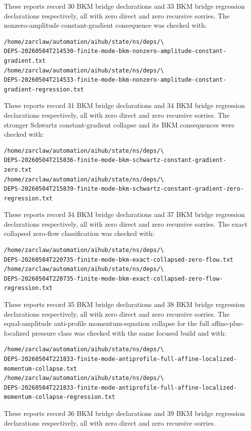 \documentclass[11pt]{article}
\begin{document}
These reports record 30 BKM bridge declarations and 33 BKM bridge regression
declarations respectively, all with zero direct and zero recursive sorries.
The nonzero-amplitude constant-gradient consequence was checked with:
\begin{verbatim}
/home/zarclaw/automation/aihub/state/ns/deps/\
DEPS-20260504T214530-finite-mode-bkm-nonzero-amplitude-constant-gradient.txt
/home/zarclaw/automation/aihub/state/ns/deps/\
DEPS-20260504T214533-finite-mode-bkm-nonzero-amplitude-constant-gradient-regression.txt
\end{verbatim}
These reports record 31 BKM bridge declarations and 34 BKM bridge regression
declarations respectively, all with zero direct and zero recursive sorries.
The stronger Schwartz constant-gradient collapse and its BKM consequences were
checked with:
\begin{verbatim}
/home/zarclaw/automation/aihub/state/ns/deps/\
DEPS-20260504T215836-finite-mode-bkm-schwartz-constant-gradient-zero.txt
/home/zarclaw/automation/aihub/state/ns/deps/\
DEPS-20260504T215839-finite-mode-bkm-schwartz-constant-gradient-zero-regression.txt
\end{verbatim}
These reports record 34 BKM bridge declarations and 37 BKM bridge regression
declarations respectively, all with zero direct and zero recursive sorries.
The exact collapsed zero-flow classification was checked with:
\begin{verbatim}
/home/zarclaw/automation/aihub/state/ns/deps/\
DEPS-20260504T220735-finite-mode-bkm-exact-collapsed-zero-flow.txt
/home/zarclaw/automation/aihub/state/ns/deps/\
DEPS-20260504T220735-finite-mode-bkm-exact-collapsed-zero-flow-regression.txt
\end{verbatim}
These reports record 35 BKM bridge declarations and 38 BKM bridge regression
declarations respectively, all with zero direct and zero recursive sorries.
The equal-amplitude anti-profile momentum-equation collapse for the full
affine-plus-localized pressure class was checked with the same focused build
and with:
\begin{verbatim}
/home/zarclaw/automation/aihub/state/ns/deps/\
DEPS-20260504T221833-finite-mode-antiprofile-full-affine-localized-momentum-collapse.txt
/home/zarclaw/automation/aihub/state/ns/deps/\
DEPS-20260504T221833-finite-mode-antiprofile-full-affine-localized-momentum-collapse-regression.txt
\end{verbatim}
These reports record 36 BKM bridge declarations and 39 BKM bridge regression
declarations respectively, all with zero direct and zero recursive sorries.
\end{document}

